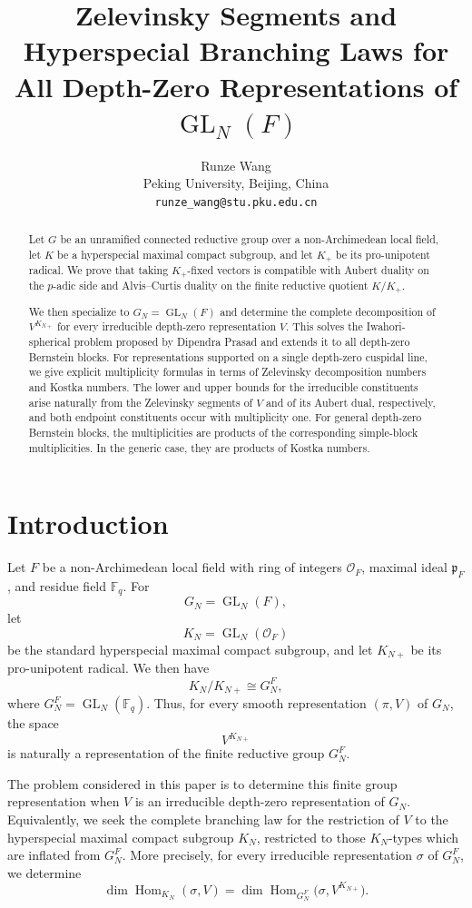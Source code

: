 \documentclass[12pt]{article}
\title{Zelevinsky Segments and Hyperspecial Branching Laws for All Depth-Zero Representations of $\operatorname{GL}_N(F)$}
\author{Runze Wang\\
Peking University, Beijing, China\\
\texttt{runze\_wang@stu.pku.edu.cn}}
\date{}
\theoremstyle{remark}
\begin{document}
\maketitle

\begin{abstract}
Let \(G\) be an unramified connected reductive group over a
non-Archimedean local field, let \(K\) be a hyperspecial maximal
compact subgroup, and let \(K_+\) be its pro-unipotent radical.
We prove that taking \(K_+\)-fixed vectors is compatible with
Aubert duality on the \(p\)-adic side and Alvis--Curtis duality
on the finite reductive quotient \(K/K_+\).

We then specialize to \(G_N=\operatorname{GL}_N(F)\) and determine
the complete decomposition of \(V^{K_{N+}}\) for every
irreducible depth-zero representation \(V\). This solves the
Iwahori-spherical problem proposed by Dipendra Prasad and extends
it to all depth-zero Bernstein blocks. For representations
supported on a single depth-zero cuspidal line, we give explicit
multiplicity formulas in terms of Zelevinsky decomposition
numbers and Kostka numbers. The lower and upper bounds for the
irreducible constituents arise naturally from the Zelevinsky
segments of \(V\) and of its Aubert dual, respectively, and both
endpoint constituents occur with multiplicity one. For general
depth-zero Bernstein blocks, the multiplicities are products of
the corresponding simple-block multiplicities. In the generic
case, they are products of Kostka numbers.
\end{abstract}

\section{Introduction}

Let \(F\) be a non-Archimedean local field with ring of integers
\(\mathcal O_F\), maximal ideal \(\mathfrak p_F\), and residue field
\(\mathbb F_q\). For
$$
G_N=\operatorname{GL}_N(F),
$$
let
$$
K_N=\operatorname{GL}_N(\mathcal O_F)
$$
be the standard hyperspecial maximal compact subgroup, and let
\(K_{N+}\) be its pro-unipotent radical. We then have
$$
K_N/K_{N+}\cong G_N^F,
$$
where \(G_N^F=\operatorname{GL}_N(\mathbb F_q)\). Thus, for every smooth representation \((\pi,V)\) of \(G_N\), the
space
$$
V^{K_{N+}}
$$
is naturally a representation of the finite reductive group
\(G_N^F\).

The problem considered in this paper is to determine this finite
group representation when \(V\) is an irreducible depth-zero
representation of \(G_N\). Equivalently, we seek the complete
branching law for the restriction of \(V\) to the hyperspecial
maximal compact subgroup \(K_N\), restricted to those
\(K_N\)-types which are inflated from
\(G_N^F\). More precisely, for every
irreducible representation \(\sigma\) of
\(G_N^F\), we determine
$$
\dim\operatorname{Hom}_{K_N}(\sigma,V)
=
\dim\operatorname{Hom}_{G_N^F}
\bigl(\sigma,V^{K_{N+}}\bigr).
$$
\end{document}
